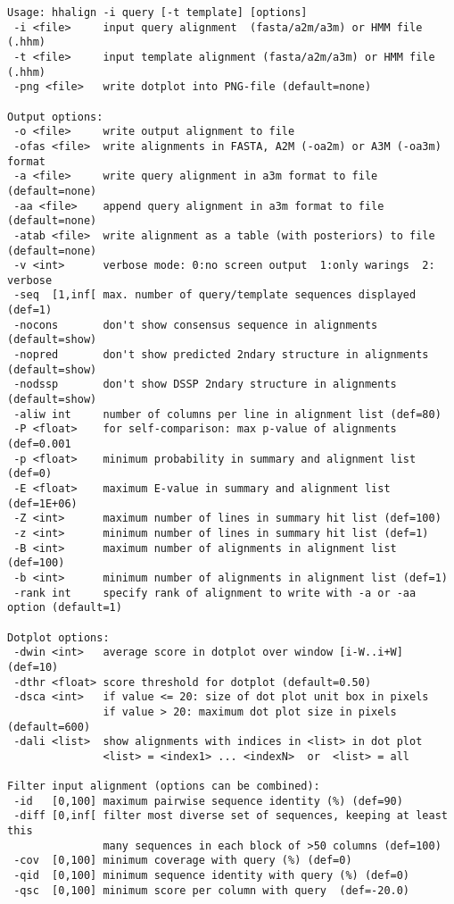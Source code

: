 \documentclass[11pt,a4paper]{article}
\begin{document}
\small \begin{verbatim}
Usage: hhalign -i query [-t template] [options]  
 -i <file>     input query alignment  (fasta/a2m/a3m) or HMM file (.hhm)
 -t <file>     input template alignment (fasta/a2m/a3m) or HMM file (.hhm)
 -png <file>   write dotplot into PNG-file (default=none)           

Output options:                                                           
 -o <file>     write output alignment to file
 -ofas <file>  write alignments in FASTA, A2M (-oa2m) or A3M (-oa3m) format   
 -a <file>     write query alignment in a3m format to file (default=none)
 -aa <file>    append query alignment in a3m format to file (default=none)
 -atab <file>  write alignment as a table (with posteriors) to file (default=none)
 -v <int>      verbose mode: 0:no screen output  1:only warings  2: verbose
 -seq  [1,inf[ max. number of query/template sequences displayed  (def=1)  
 -nocons       don't show consensus sequence in alignments (default=show) 
 -nopred       don't show predicted 2ndary structure in alignments (default=show) 
 -nodssp       don't show DSSP 2ndary structure in alignments (default=show) 
 -aliw int     number of columns per line in alignment list (def=80)
 -P <float>    for self-comparison: max p-value of alignments (def=0.001
 -p <float>    minimum probability in summary and alignment list (def=0) 
 -E <float>    maximum E-value in summary and alignment list (def=1E+06)     
 -Z <int>      maximum number of lines in summary hit list (def=100)       
 -z <int>      minimum number of lines in summary hit list (def=1)       
 -B <int>      maximum number of alignments in alignment list (def=100)    
 -b <int>      minimum number of alignments in alignment list (def=1)    
 -rank int     specify rank of alignment to write with -a or -aa option (default=1)

Dotplot options:
 -dwin <int>   average score in dotplot over window [i-W..i+W] (def=10)      
 -dthr <float> score threshold for dotplot (default=0.50)                    
 -dsca <int>   if value <= 20: size of dot plot unit box in pixels           
               if value > 20: maximum dot plot size in pixels (default=600)   
 -dali <list>  show alignments with indices in <list> in dot plot            
               <list> = <index1> ... <indexN>  or  <list> = all              

Filter input alignment (options can be combined):                         
 -id   [0,100] maximum pairwise sequence identity (%) (def=90)   
 -diff [0,inf[ filter most diverse set of sequences, keeping at least this    
               many sequences in each block of >50 columns (def=100)
 -cov  [0,100] minimum coverage with query (%) (def=0) 
 -qid  [0,100] minimum sequence identity with query (%) (def=0) 
 -qsc  [0,100] minimum score per column with query  (def=-20.0)


\end{verbatim}
\end{document}

